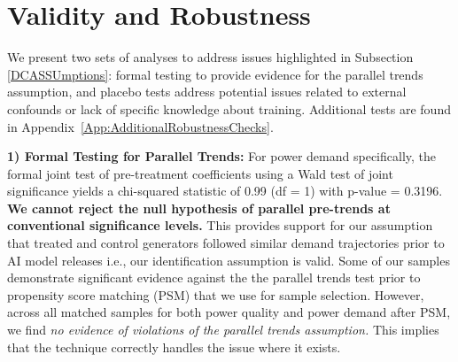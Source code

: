 \documentclass[a4paper,fleqn,longmktitle]{cas-sc}
\newcommand{\nb}[1]{\textcolor{blue}{NB[#1]}}
\theoremstyle{plain}
\theoremstyle{definition}
\begin{document}
\section{Validity and Robustness}\label{Robustness}
We present two sets of analyses to address issues highlighted in Subsection \ref{DCASSUmptions}: formal testing to provide evidence for the parallel trends assumption, and placebo tests address potential issues related to external confounds or lack of specific knowledge about training. Additional tests are found in Appendix~\ref{App:AdditionalRobustnessChecks}.

\noindent\textbf{1) Formal Testing for Parallel Trends: } For power demand specifically, the formal joint test of pre-treatment coefficients using a Wald test of joint significance yields a chi-squared statistic of 0.99 (df = 1) with p-value = 0.3196. \textbf{We cannot reject the null hypothesis of parallel pre-trends at conventional significance levels.} This provides support for our assumption that treated and control generators followed similar demand trajectories prior to AI model releases i.e., our identification assumption is valid. Some of our samples demonstrate significant evidence against the the parallel trends test prior to propensity score matching (PSM) that we use for sample selection. However, across all matched samples for both power quality and power demand after PSM, we find \textit{no evidence of violations of the parallel trends assumption.}
This implies that the technique correctly handles the issue where it exists. 
 
\end{document}
